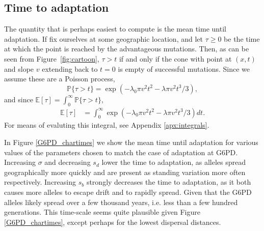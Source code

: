 \documentclass{article}
\renewcommand{\P}{\mathbb{P}}
\newcommand{\E}{\mathbb{E}}
\begin{document}

\subsection{Time to adaptation}

The quantity that is perhaps easiest to compute is the mean time until adaptation.
If fix ourselves at some geographic location, and let $\tau \ge 0$ be the time at which the point is reached by the advantageous mutations.
Then, as can be seen from Figure~\ref{fig:cartoon},
$\tau > t$ if and only if the cone with point at $(x,t)$ and slope $v$ extending back to $t=0$ is empty of successful mutations.
Since we assume these are a Poisson process, 
\begin{equation}
    \P\{ \tau > t \} = \exp\left( - \lambda_0 \pi v^2 t^2 - \lambda \pi v^2 t^3 / 3 \right) ,
\end{equation}
and since $\E[\tau] = \int_0^\infty \P\{ \tau > t \}$,
\begin{align}
    \E[\tau] %
        &= \int_0^\infty \exp\left( - \lambda_0 \pi v^2 t^2 - \lambda \pi v^2 t^3 / 3 \right) dt.
\end{align}
For means of evaluting this integral, see Appendix \ref{apx:integrals}.


In Figure \ref{G6PD_chartimes} we show the mean time until adaptation
for various values of the parameters chosen to match the case of
adaptation at G6PD. Increasing $\sigma$ and decreasing $s_d$ lower 
the time to adaptation, as alleles spread geographically more quickly
and are present as standing variation more often
respectively. Increasing $s_b$ strongly decreases the time to
adaptation, as it both causes more alleles to escape drift and to
rapidly spread. Given that the G6PD alleles likely spread over a few
thousand years, i.e. less than a few hundred generations. This
time-scale seems quite plausible given Figure \ref{G6PD_chartimes},
except perhaps for the lowest dispersal distances.  
\end{document}

